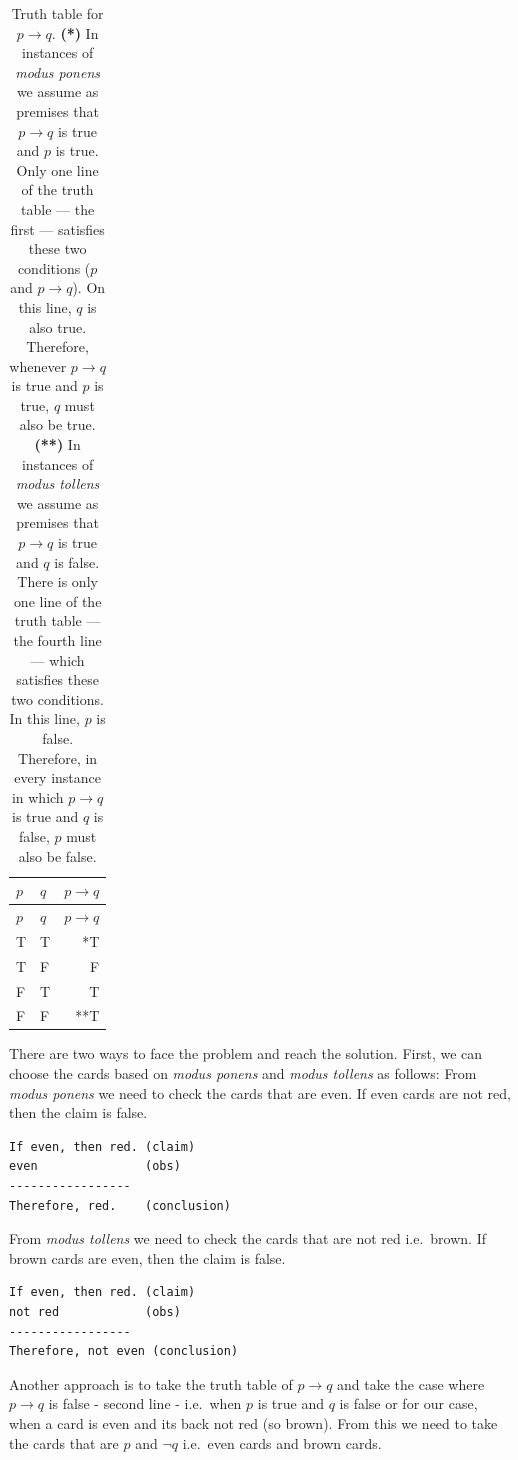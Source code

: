 \documentclass[
  12pt,
]{book}
\begin{document}
\begin{longtable}[]{@{}llr@{}}
\caption{Truth table for \(p \rightarrow q\). \textbf{(*)} In instances of \emph{modus ponens} we assume as premises that \(p \rightarrow q\) is true and \(p\) is true. Only one line of the truth table --- the first --- satisfies these two conditions (\(p\) and \(p \rightarrow q\)). On this line, \(q\) is also true. Therefore, whenever \(p \rightarrow q\) is true and \(p\) is true, \(q\) must also be true. \textbf{(**)} In instances of \emph{modus tollens} we assume as premises that \(p \rightarrow q\) is true and \(q\) is false. There is only one line of the truth table --- the fourth line --- which satisfies these two conditions. In this line, \(p\) is false. Therefore, in every instance in which \(p \rightarrow q\) is true and \(q\) is false, \(p\) must also be false.}\tabularnewline
\toprule\noalign{}
\(p\) & \(q\) & \(p \rightarrow q\) \\
\midrule\noalign{}
\endfirsthead
\toprule\noalign{}
\(p\) & \(q\) & \(p \rightarrow q\) \\
\midrule\noalign{}
\endhead
\bottomrule\noalign{}
\endlastfoot
T & T & *T \\
T & F & F \\
F & T & T \\
F & F & **T \\
\end{longtable}





There are two ways to face the problem and reach the solution. First, we can choose the cards based on \emph{modus ponens} and \emph{modus tollens} as follows: From \emph{modus ponens} we need to check the cards that are even. If even cards are not red, then the claim is false.

\begin{verbatim}
If even, then red. (claim)
even               (obs)
-----------------
Therefore, red.    (conclusion)
\end{verbatim}

From \emph{modus tollens} we need to check the cards that are not red i.e.~brown. If brown cards are even, then the claim is false.

\begin{verbatim}
If even, then red. (claim)
not red            (obs)
-----------------
Therefore, not even (conclusion)
\end{verbatim}

Another approach is to take the truth table of \(p \rightarrow q\) and take the case where \(p \rightarrow q\) is false - second line - i.e.~when \(p\) is true and \(q\) is false or for our case, when a card is even and its back not red (so brown). From this we need to take the cards that are \(p\) and \(\lnot q\) i.e.~even cards and brown cards.
\end{document}
